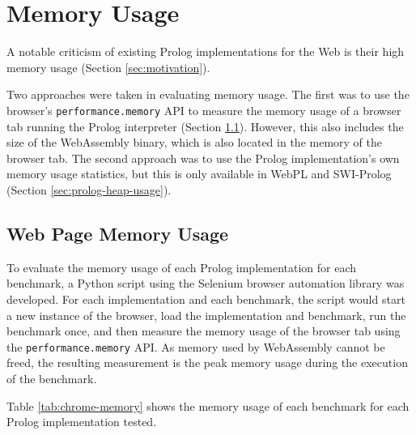 \section{Memory Usage}

\label{sec:memory-usage}

A notable criticism of existing Prolog implementations for the Web is their high memory usage (Section \ref{sec:motivation}).

Two approaches were taken in evaluating memory usage. The first was to use the browser's \texttt{performance.memory} API to measure the memory usage of a browser tab running the Prolog interpreter (Section \ref{sec:web-page-memory-usage}). However, this also includes the size of the WebAssembly binary, which is also located in the memory of the browser tab. The second approach was to use the Prolog implementation's own memory usage statistics, but this is only available in WebPL and SWI-Prolog (Section \ref{sec:prolog-heap-usage}).

\subsection{Web Page Memory Usage}

\label{sec:web-page-memory-usage}

To evaluate the memory usage of each Prolog implementation for each benchmark, a Python script using the Selenium browser automation library was developed. For each implementation and each benchmark, the script would start a new instance of the browser, load the implementation and benchmark, run the benchmark once, and then measure the memory usage of the browser tab using the \texttt{performance.memory} API. As memory used by WebAssembly cannot be freed, the resulting measurement is the peak memory usage during the execution of the benchmark.

Table \ref{tab:chrome-memory} shows the memory usage of each benchmark for each Prolog implementation tested.

